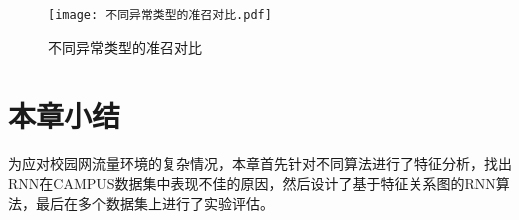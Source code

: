 
\begin{figure}
  \centering
  \texttt{[image: 不同异常类型的准召对比.pdf]}
  \caption{不同异常类型的准召对比}
  \label{fig:不同异常类型的准召对比}
\end{figure}

\section{本章小结}
为应对校园网流量环境的复杂情况，本章首先针对不同算法进行了特征分析，找出RNN在CAMPUS数据集中表现不佳的原因，然后设计了基于特征关系图的RNN算法，最后在多个数据集上进行了实验评估。








